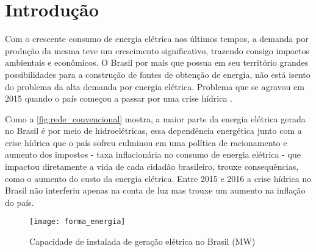 \chapter[Introdução]{Introdução}
\label{ch:introdução}
Com o crescente consumo de energia elétrica nos últimos tempos, a demanda por produção da mesma teve um crescimento significativo, trazendo consigo 
impactos ambientais e econômicos. O Brasil por mais que possua em seu território grandes possibilidades para a construção de fontes de obtenção de energia, não
está isento do problema da alta demanda por energia elétrica. Problema que se agravou em 2015 quando o país começou a passar por
uma crise hídrica \cite{crise-hidrica-2015}.

Como a \autoref{fig:rede_convencional} mostra, a maior parte da energia elétrica gerada no Brasil é por meio de hidroelétricas, essa dependência
energética junto com a crise hídrica que o país sofreu culminou em uma política de racionamento e aumento dos impostos - taxa inflacionária no
consumo de energia elétrica - que impactou diretamente a vida de cada cidadão brasileiro, trouxe consequências, como o aumento do 
custo da energia elétrica. Entre 2015 e 2016 a crise hídrica no Brasil não interferiu apenas na conta de luz mas trouxe
um aumento na inflação do país.




\begin{figure}[h!]
	\texttt{[image: forma\_energia]}
	\centering
	\caption[Capacidade de instalada de geração elétrica no Brasil (MW)]{Capacidade de instalada de geração elétrica no Brasil (MW)}
	\label{fig:rede_convencional}
\end{figure}
\FloatBarrier


